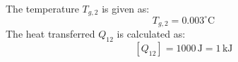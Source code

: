 The temperature \( T_{g,2} \) is given as:  
\[
T_{g,2} = 0.003^\circ \text{C}
\]  
The heat transferred \( Q_{12} \) is calculated as:  
\[
[Q_{12}] = 1000 \, \text{J} = 1 \, \text{kJ}
\]